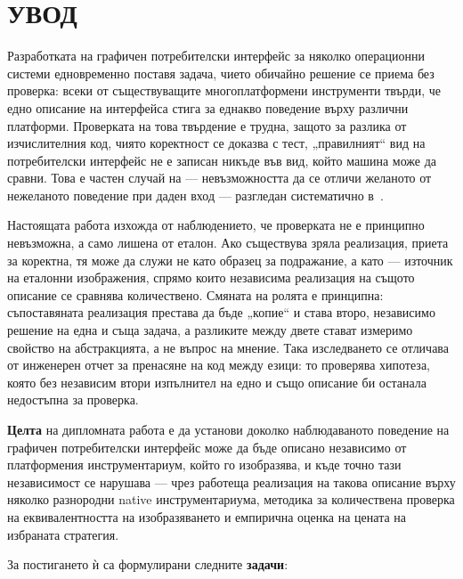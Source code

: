 \section*{УВОД}
\label{sec:introduction}

Разработката на графичен потребителски интерфейс за няколко операционни системи
едновременно поставя задача, чието обичайно решение се приема без проверка: всеки от
съществуващите многоплатформени инструменти твърди, че едно описание на интерфейса
стига за еднакво поведение върху различни платформи. Проверката на това твърдение е
трудна, защото за разлика от изчислителния код, чиято коректност се доказва с тест,
„правилният“ вид на потребителски интерфейс не е записан никъде във вид, който машина
може да сравни. Това е частен случай на  --- невъзможността
да се отличи желаното от нежеланото поведение при даден вход --- разгледан систематично
в~\cite{barr2015oracle}.

Настоящата работа изхожда от наблюдението, че проверката не е принципно невъзможна, а
само лишена от еталон. Ако съществува зряла реализация, приета за коректна, тя може да
служи не като образец за подражание, а като  --- източник
на еталонни изображения, спрямо които независима реализация на същото описание се
сравнява количествено. Смяната на ролята е принципна: съпоставяната реализация
престава да бъде „копие“ и става второ, независимо решение на една и съща задача, а
разликите между двете стават измеримо свойство на абстракцията, а не въпрос на мнение.
Така изследването се отличава от инженерен отчет за пренасяне на код между езици: то
проверява хипотеза, която без независим втори изпълнител на едно и също описание би
останала недостъпна за проверка.

\textbf{Целта} на дипломната работа е да установи доколко наблюдаваното поведение на
графичен потребителски интерфейс може да бъде описано независимо от платформения
инструментариум, който го изобразява, и къде точно тази независимост се нарушава ---
чрез работеща реализация на такова описание върху няколко разнородни native
инструментариума, методика за количествена проверка на еквивалентността на
изобразяването и емпирична оценка на цената на избраната стратегия.

За постигането ѝ са формулирани следните \textbf{задачи}:

